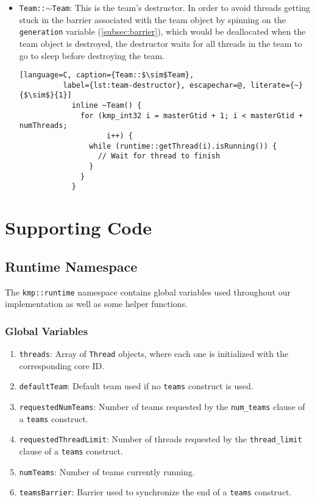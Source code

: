 \begin{itemize}
	\item \texttt{Team::$\sim$Team}: This is the team's destructor. In order to avoid threads
	      getting stuck in the barrier associated with the team object by spinning on the
	      \texttt{generation} variable (\cref{subsec:barrier}), which would be deallocated when the team
	      object is destroyed, the destructor waits for all threads in the team to go to sleep before
	      destroying the team.

	      \begin{lstlisting}[language=C, caption={Team::$\sim$Team},
          label={lst:team-destructor}, escapechar=@, literate={~} {$\sim$}{1}]
            inline ~Team() {
              for (kmp_int32 i = masterGtid + 1; i < masterGtid + numThreads;
                    i++) {
                while (runtime::getThread(i).isRunning()) {
                  // Wait for thread to finish
                }
              }
            }
          \end{lstlisting}

\end{itemize}

\section{Supporting Code}
\label{sec:supporting-code}

\subsection{Runtime Namespace}
\label{subsec:runtime-namespace}

The \texttt{kmp::runtime} namespace contains global variables used throughout our implementation as
well as some helper functions.

\subsubsection{Global Variables}

\begin{enumerate}
	\item \texttt{threads}: Array of \texttt{Thread} objects, where each one is initialized with the
	      corresponding core ID.
	\item \texttt{defaultTeam}: Default team used if no \texttt{teams} construct is used.
	\item \texttt{requestedNumTeams}: Number of teams requested by the \texttt{num\_teams} clause
	      of a \texttt{teams} construct.
	\item \texttt{requestedThreadLimit}: Number of threads requested by the \texttt{thread\_limit}
	      clause of a \texttt{teams} construct.
	\item \texttt{numTeams}: Number of teams currently running.
	\item \texttt{teamsBarrier}: Barrier used to synchronize the end of a \texttt{teams} construct.
\end{enumerate}

